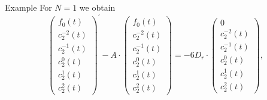 \begin{frame}{Example}
	\scriptsize
	For $N=1$ we obtain
	\begin{equation}
		\left(\begin{array}{c}
			f_0(t) \\
			c_2^{-2}(t) \\
			c_2^{-1}(t) \\
			c_2^0(t) \\
			c_2^1(t) \\
			c_2^2(t)
		\end{array}\right)^{\prime} - A \cdot
		\left(\begin{array}{c}
			f_0(t) \\
			c_2^{-2}(t) \\
			c_2^{-1}(t) \\
			c_2^0(t) \\
			c_2^1(t) \\
			c_2^2(t)
		\end{array}\right) = -6 D_r \cdot
		\left(\begin{array}{c}
			0 \\
			c^{-2}_2(t) \\
			c_2^{-1}(t) \\
			c_2^0(t) \\
			c_2^1(t) \\
			c_2^2(t)
		\end{array}\right),
	\end{equation}
\end{frame}

